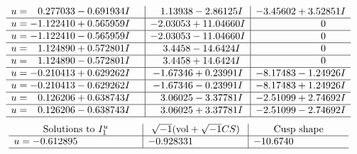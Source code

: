 \documentclass[1p]{elsarticle_modified}
\theoremstyle{definition}
\newcommand{\I}{\sqrt{-1}}
\begin{document}
$$\begin{array}{c|c|c}
\begin{aligned}
u &= \phantom{-}0.277033 - 0.691934 I\end{aligned}
 & \phantom{-}1.13938 - 2.86125 I & -3.45602 + 3.52851 I \\ \hline\begin{aligned}
u &= -1.122410 + 0.565959 I\end{aligned}
 & -2.03053 + 11.04660 I & \phantom{-0.000000 } 0 \\ \hline\begin{aligned}
u &= -1.122410 - 0.565959 I\end{aligned}
 & -2.03053 - 11.04660 I & \phantom{-0.000000 } 0 \\ \hline\begin{aligned}
u &= \phantom{-}1.124890 + 0.572801 I\end{aligned}
 & \phantom{-}3.4458 - 14.6424 I & \phantom{-0.000000 } 0 \\ \hline\begin{aligned}
u &= \phantom{-}1.124890 - 0.572801 I\end{aligned}
 & \phantom{-}3.4458 + 14.6424 I & \phantom{-0.000000 } 0 \\ \hline\begin{aligned}
u &= -0.210413 + 0.629262 I\end{aligned}
 & -1.67346 + 0.23991 I & -8.17483 - 1.24926 I \\ \hline\begin{aligned}
u &= -0.210413 - 0.629262 I\end{aligned}
 & -1.67346 - 0.23991 I & -8.17483 + 1.24926 I \\ \hline\begin{aligned}
u &= \phantom{-}0.126206 + 0.638743 I\end{aligned}
 & \phantom{-}3.06025 - 3.37781 I & -2.51099 + 2.74692 I \\ \hline\begin{aligned}
u &= \phantom{-}0.126206 - 0.638743 I\end{aligned}
 & \phantom{-}3.06025 + 3.37781 I & -2.51099 - 2.74692 I\\
 \hline 
 \end{array}$$\newpage$$\begin{array}{c|c|c}  
\text{Solutions to }I^u_{1}& \I (\text{vol} + \sqrt{-1}CS) & \text{Cusp shape}\\
 \hline 
\begin{aligned}
u &= -0.612895\phantom{ +0.000000I}\end{aligned}
 & -0.928331\phantom{ +0.000000I} & -10.6740\phantom{ +0.000000I}\\
 \hline 
 \end{array}$$\newpage
\end{document}
